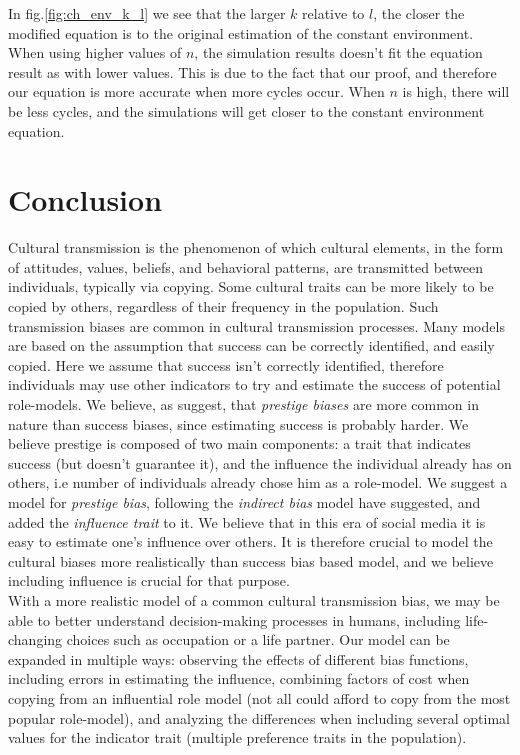 \documentclass[11pt]{article}
\begin{document}
In fig.\ref{fig:ch_env_k_l} we see that the larger $k$ relative to $l$, the closer the modified equation is to the original estimation of the constant environment. 
When using higher values of $n$, the simulation results doesn't fit the equation result as with lower values. This is due to the fact that our proof, and therefore our equation is more accurate when more cycles occur. When $n$ is high, there will be less cycles, and the simulations will get closer to the constant environment equation.

\section{Conclusion}
Cultural transmission is the phenomenon of which cultural elements, in the form of attitudes, values, beliefs, and behavioral patterns, are transmitted between individuals, typically via copying.
Some cultural traits can be more likely to be copied by others, regardless of their frequency in the population.  
Such transmission biases are common in cultural transmission processes. 
Many models are based on the assumption that success can be correctly identified, and easily copied.
Here we assume that success isn't correctly identified, therefore individuals may use other indicators to try and estimate the success of potential role-models.
We believe, as \citet{complexityPaper} suggest, that \textit{prestige biases} are more common in nature than success biases, since estimating success is probably harder.
We believe prestige is composed of two main components: a trait that indicates success (but doesn't guarantee it), and the influence the individual already has on others, i.e number of individuals already chose him as a role-model.
We suggest a model for \textit{prestige bias}, following the \textit{indirect bias} model \citet{evolutionBook} have suggested, and added the \textit{influence trait} to it.
We believe that in this era of social media it is easy to estimate one's influence over others.
It is therefore crucial to model the cultural biases more realistically than success bias based model, and we believe including influence is crucial for that purpose.\\
With a more realistic model of a common cultural transmission bias, we may be able to better understand decision-making processes in humans, including life-changing choices such as occupation or a life partner. 
Our model can be expanded in multiple ways: observing the effects of different bias functions, including errors in estimating the influence, combining factors of cost when copying from an influential role model (not all could afford to copy from the most popular role-model), and analyzing the differences when including several optimal values for the indicator trait (multiple preference traits in the population).
\end{document}
